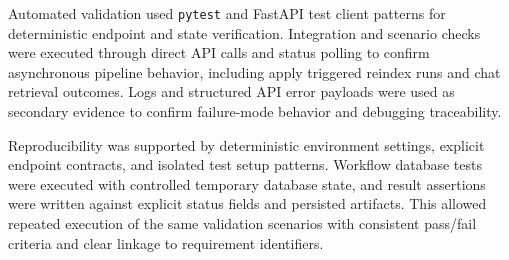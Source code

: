 Automated validation used \texttt{pytest} and FastAPI test client patterns for deterministic endpoint and state verification. Integration and scenario checks were executed through direct API calls and status polling to confirm asynchronous pipeline behavior, including apply triggered reindex runs and chat retrieval outcomes. Logs and structured API error payloads were used as secondary evidence to confirm failure-mode behavior and debugging traceability.

\vspace{0.4cm}

Reproducibility was supported by deterministic environment settings, explicit endpoint contracts, and isolated test setup patterns. Workflow database tests were executed with controlled temporary database state, and result assertions were written against explicit status fields and persisted artifacts.
This allowed repeated execution of the same validation scenarios with consistent pass/fail criteria and clear linkage to requirement identifiers.